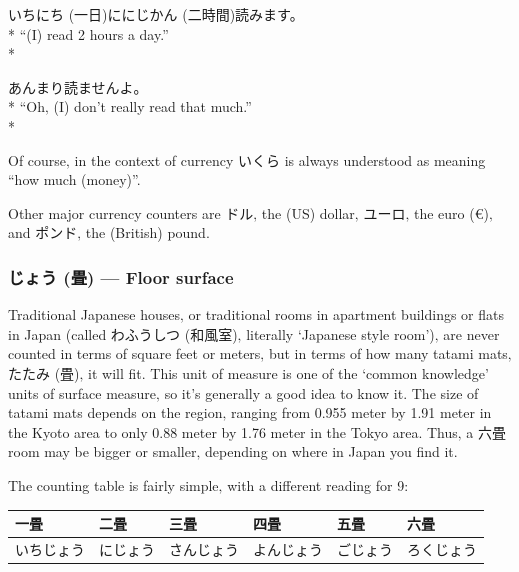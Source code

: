\documentclass[11pt, b5paper, twoside, openright, onecolumn]{book}
\makeatletter
\newcommand*{\rubystack}[2]{{\relscale{0.5}%
  \begin{tabular}[b]{@{}c@{}}%
    {#1}\\%
   {\textscale{2}{#2}}%
  \end{tabular}}%
}
\DeclareRobustCommand*{\ruby}[2]{%
  \mbox{%
    \setlength{\parskip}{0ex}%
    \BeginAccSupp{method=pdfstringdef,ActualText={#1}}%
      \rubystack{\phantom{#2}}{#1}%
      \llap{%
        \rubystack{#2}{\phantom{#1}}%
      }%
    \EndAccSupp{}%
  }%
}
\renewcommand*{\ruby}[2]{#2 (#1)}%
\newenvironment{exampleblock}{
\setlength{\parindent}{0.6in}
\begin{minipage}[t]{\dimexpr\textwidth-\parindent}}
{\end{minipage}}
\newenvironment{mytabular}[1]{\noindent\hspace{0.4in}
\begin{tabular}[h]{#1}}{\end{tabular}}
\makeatother
\begin{document}
\begin{exampleblock}
\ruby{一日}{いちにち}に\ruby{二時間}{にじかん}読みます。 \\* 
“(I) read 2 hours a day.” \\* 
\end{exampleblock}
\vspace{0.2cm}

\begin{exampleblock}
あんまり読ませんよ。 \\* 
“Oh‚ (I) don’t really read that much.” \\* 
\end{exampleblock}
\vspace{0.2cm}

Of course‚ in the context of currency いくら is always understood as meaning “how much (money)”.

Other major currency counters are ドル‚ the (US) dollar‚ ユーロ‚ the euro (€)‚ and ポンド‚ the (British) pound.

\subsubsection{\ruby{畳}{じょう} — Floor surface}

Traditional Japanese houses‚ or traditional rooms in apartment buildings or flats in Japan (called \ruby{和風室}{わふうしつ}‚ literally ‘Japanese style room’)‚ are never counted in terms of square feet or meters‚ but in terms of how many tatami mats‚ \ruby{畳}{たたみ}‚ it will fit. This unit of measure is one of the ‘common knowledge’ units of surface measure‚ so it’s generally a good idea to know it. The size of tatami mats depends on the region‚ ranging from 0.955 meter by 1.91 meter in the Kyoto area to only 0.88 meter by 1.76 meter in the Tokyo area. Thus‚ a 六畳 room may be bigger or smaller‚ depending on where in Japan you find it.

The counting table is fairly simple‚ with a different reading for 9:

\vspace{0.5cm}
\smaller
\begin{mytabular}{| l  l  l  l  l  l |}\hline 
\rule{0pt}{2.4ex}一畳 & 二畳 & 三畳 & 四畳 & 五畳 & 六畳\\ 
\hline
\rule{0pt}{2.4ex}いちじょう & にじょう & さんじょう & よんじょう & ごじょう & ろくじょう\\ 
\hline 
\end{mytabular}
\larger
\vspace{0.5cm}
\end{document}
